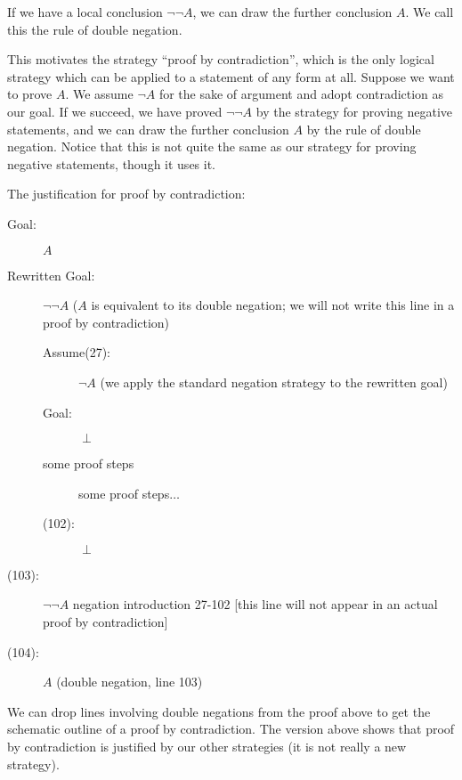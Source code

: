 \documentclass[12pt]{article}
\begin{document}
If we have a local conclusion $\neg\neg A$, we can draw the further
conclusion $A$.  We call this the rule of double negation.

This motivates the strategy ``proof by contradiction'', which is the
only logical strategy which can be applied to a statement of any form
at all.  Suppose we want to prove $A$.  We assume $\neg A$ for the
sake of argument and adopt contradiction as our goal.  If we succeed,
we have proved $\neg\neg A$ by the strategy for proving negative
statements, and we can draw the further conclusion $A$ by the rule of
double negation.  Notice that this is not quite the same as our
strategy for proving negative statements, though it uses it.


The justification for proof by contradiction:

\begin{description}

\item[Goal:]  $A$

\item[Rewritten Goal:]  $\neg\neg A$ ($A$ is equivalent to its double negation; we will not write this line in a proof by contradiction)

\begin{description}

\item[Assume(27):]  $\neg A$  (we apply the standard negation strategy to the rewritten goal)

\item[Goal:]    $\perp$

\item[some proof steps]  some proof steps$\ldots$

\item[(102):]  $\perp$

\end{description}

\item[(103):]  $\neg\neg A$  negation introduction 27-102  [this line will not appear in an actual proof by contradiction]

\item[(104):]  $A$ (double negation, line 103)

\end{description}

We can drop lines involving double negations from the proof above to get the schematic outline of a proof by contradiction.  The version above shows that proof by contradiction is justified by our other strategies (it is not really a new strategy).
\end{document}
